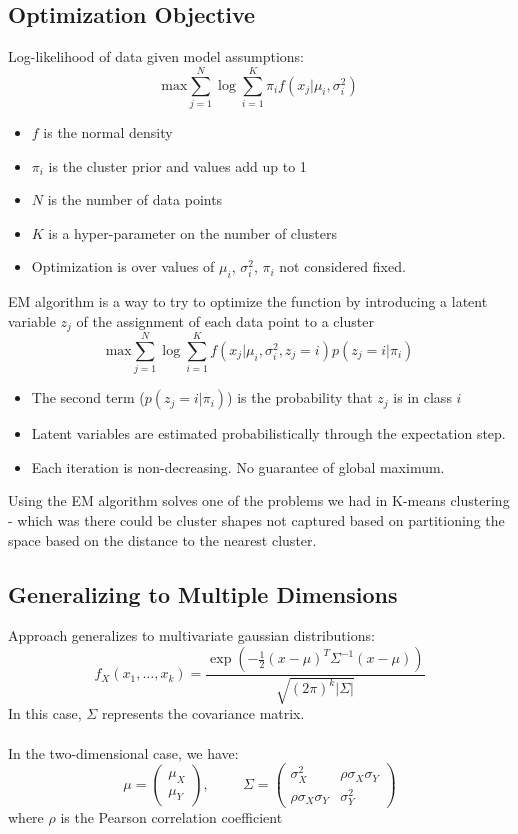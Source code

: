 \documentclass[10pt]{article}
\begin{document}
\subsection*{Optimization Objective}
Log-likelihood of data given model assumptions:
\[\text{max} \sum_{j = 1}^N \log \sum_{i = 1}^K \pi_i f(x_j|\mu_i, \sigma_i^2)\]
\begin{itemize}
    \item $f$ is the normal density
    \item $\pi_i$ is the cluster prior and values add up to 1
    \item $N$ is the number of data points
    \item $K$ is a hyper-parameter on the number of clusters
    \item Optimization is over values of $\mu_i$, $\sigma_i^2$, $\pi_i$ not considered fixed.
\end{itemize}
EM algorithm is a way to try to optimize the function by introducing a latent variable $z_j$ of the assignment of each data point to a cluster
\[\text{max} \sum_{j = 1}^N \log \sum_{i = 1}^K f(x_j | \mu_i, \sigma_i^2, z_j = i) p(z_j = i | \pi_i)\]
\begin{itemize}
    \item The second term ($p(z_j = i | \pi_i)$) is the probability that $z_j$ is in class $i$
    \item Latent variables are estimated probabilistically through the expectation step.
    \item Each iteration is non-decreasing.  No guarantee of global maximum.
\end{itemize}

Using the EM algorithm solves one of the problems we had in K-means clustering - which was there could be cluster shapes not captured based on partitioning the space based on the distance to the nearest cluster.

\subsection*{Generalizing to Multiple Dimensions}
Approach generalizes to multivariate gaussian distributions:
\[f_X(x_1, \dots, x_k) = \frac{\exp\left(-\frac{1}{2}(x - \mu)^T \Sigma^{-1}(x - \mu)\right)}{\sqrt{(2\pi)^k |\Sigma|}}\]
In this case, $\Sigma$ represents the covariance matrix.\\\\
In the two-dimensional case, we have:
\[\mu = \begin{pmatrix} \mu_X \\ \mu_Y \end{pmatrix}, \hspace{1cm} \Sigma = \begin{pmatrix} \sigma_X^2 & \rho \sigma_X \sigma_Y \\ \rho \sigma_X \sigma_Y & \sigma_Y^2 \end{pmatrix}\]
where $\rho$ is the Pearson correlation coefficient
\end{document}
